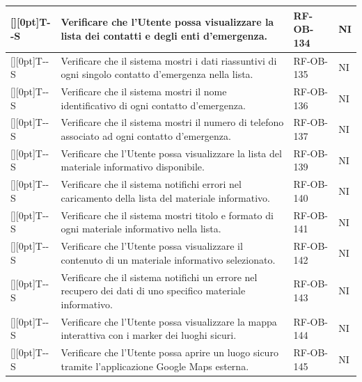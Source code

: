 \documentclass[a4paper,12pt]{article}
\newcounter{testsys}
\newcommand{\systestcode}{%
  \raisebox{0pt}[\height][0pt]{\hypertarget{T-\arabic{testsys}-S}{}}T-\arabic{testsys}-S%
}
\begin{document}
\begin{longtable}{| >{\centering\arraybackslash}p{} | >{\raggedright\arraybackslash}p{} | >{\centering\arraybackslash}p{} | >{\centering\arraybackslash}p{} |}
\stepcounter{testsys} \systestcode & Verificare che l'Utente possa visualizzare la lista dei contatti e degli enti d'emergenza. & RF-OB-134 & NI \\
\hline

\stepcounter{testsys} \systestcode & Verificare che il sistema mostri i dati riassuntivi di ogni singolo contatto d'emergenza nella lista. & RF-OB-135 & NI \\
\hline

\stepcounter{testsys} \systestcode & Verificare che il sistema mostri il nome identificativo di ogni contatto d'emergenza. & RF-OB-136 & NI \\
\hline

\stepcounter{testsys} \systestcode & Verificare che il sistema mostri il numero di telefono associato ad ogni contatto d'emergenza. & RF-OB-137 & NI \\
\hline

\stepcounter{testsys} \systestcode & Verificare che l'Utente possa visualizzare la lista del materiale informativo disponibile. & RF-OB-139 & NI \\
\hline

\stepcounter{testsys} \systestcode & Verificare che il sistema notifichi errori nel caricamento della lista del materiale informativo. & RF-OB-140 & NI \\
\hline

\stepcounter{testsys} \systestcode & Verificare che il sistema mostri titolo e formato di ogni materiale informativo nella lista. & RF-OB-141 & NI \\
\hline

\stepcounter{testsys} \systestcode & Verificare che l'Utente possa visualizzare il contenuto di un materiale informativo selezionato. & RF-OB-142 & NI \\
\hline

\stepcounter{testsys} \systestcode & Verificare che il sistema notifichi un errore nel recupero dei dati di uno specifico materiale informativo. & RF-OB-143 & NI \\
\hline

\stepcounter{testsys} \systestcode & Verificare che l'Utente possa visualizzare la mappa interattiva con i marker dei luoghi sicuri. & RF-OB-144 & NI \\
\hline

\stepcounter{testsys} \systestcode & Verificare che l'Utente possa aprire un luogo sicuro tramite l'applicazione Google Maps esterna. & RF-OB-145 & NI \\
\hline


\end{longtable}
\end{document}

